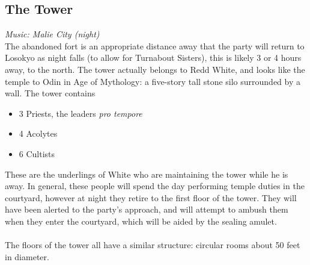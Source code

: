\subsection{The Tower}
\textit{Music: Malie City (night)}\\
The abandoned fort is an appropriate distance away that the party will return to Losokyo as night falls (to allow for Turnabout Sisters), this is likely 3 or 4 hours away, to the north. The tower actually belongs to Redd White, and looks like the temple to Odin in Age of Mythology: a five-story tall stone silo surrounded by a wall. The tower contains
\begin{itemize}
\item 3 Priests, the leaders \textit{pro tempore}
\item 4 Acolytes
\item 6 Cultists
\end{itemize}
These are the underlings of White who are maintaining the tower while he is away. In general, these people will spend the day performing temple duties in the courtyard, however at night they retire to the first floor of the tower. They will have been alerted to the party's approach, and will attempt to ambush them when they enter the courtyard, which will be aided by the sealing amulet. \\
\\
The floors of the tower all have a similar structure: circular rooms about 50 feet in diameter.
